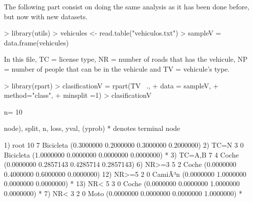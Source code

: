 \documentclass[a4paper]{article}
\begin{document}
The following part consist on doing the same analysis as it has been done before, but now with new datasets.
\begin{Schunk}
\begin{Sinput}
> library(utils)
> vehicules <- read.table("vehiculos.txt")
> sampleV = data.frame(vehicules)
\end{Sinput}
\end{Schunk}
In this file, TC = license type, NR = number of roads that  has the vehicule, NP = number of people that can be in the vehicule and TV = vehicule's type.
\begin{Schunk}
\begin{Sinput}
> library(rpart)
> clasificationV = rpart(TV ~.,
+                        data = sampleV,
+                        method="class",
+                        minsplit =1)
> clasificationV
\end{Sinput}
\begin{Soutput}
n= 10 

node), split, n, loss, yval, (yprob)
      * denotes terminal node

 1) root 10 7 Bicicleta (0.3000000 0.2000000 0.3000000 0.2000000)  
   2) TC=N 3 0 Bicicleta (1.0000000 0.0000000 0.0000000 0.0000000) *
   3) TC=A,B 7 4 Coche (0.0000000 0.2857143 0.4285714 0.2857143)  
     6) NR>=3 5 2 Coche (0.0000000 0.4000000 0.6000000 0.0000000)  
      12) NR>=5 2 0 CamiÃ³n (0.0000000 1.0000000 0.0000000 0.0000000) *
      13) NR< 5 3 0 Coche (0.0000000 0.0000000 1.0000000 0.0000000) *
     7) NR< 3 2 0 Moto (0.0000000 0.0000000 0.0000000 1.0000000) *
\end{Soutput}
\end{Schunk}
\end{document}
